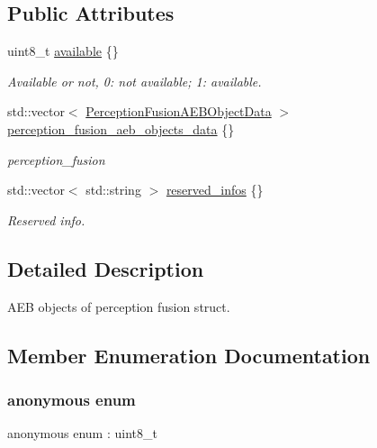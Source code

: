 \subsection*{Public Attributes}
\begin{DoxyCompactItemize}
\item 
uint8\+\_\+t \hyperlink{structmaf__perception__interface_1_1PerceptionFusionAEBObjects_a96c15fc402b3898c14ec65bafa74fe63}{available} \{\}
\begin{DoxyCompactList}\small\item\em Available or not, 0\+: not available; 1\+: available. \end{DoxyCompactList}\item 
std\+::vector$<$ \hyperlink{structmaf__perception__interface_1_1PerceptionFusionAEBObjectData}{Perception\+Fusion\+A\+E\+B\+Object\+Data} $>$ \hyperlink{structmaf__perception__interface_1_1PerceptionFusionAEBObjects_a15ea008bb090010a7ac10b88a3b1d8ce}{perception\+\_\+fusion\+\_\+aeb\+\_\+objects\+\_\+data} \{\}
\begin{DoxyCompactList}\small\item\em perception\+\_\+fusion \end{DoxyCompactList}\item 
std\+::vector$<$ std\+::string $>$ \hyperlink{structmaf__perception__interface_1_1PerceptionFusionAEBObjects_ad0d0a4497b269c4feaf6aa99e64c835e}{reserved\+\_\+infos} \{\}
\begin{DoxyCompactList}\small\item\em Reserved info. \end{DoxyCompactList}\end{DoxyCompactItemize}


\subsection{Detailed Description}
A\+EB objects of perception fusion struct. 

\subsection{Member Enumeration Documentation}
\mbox{\label{structmaf__perception__interface_1_1PerceptionFusionAEBObjects_a553cda51d497a3cc79eace363ebec69d}} 
\subsubsection{\texorpdfstring{anonymous enum}{anonymous enum}}
{\footnotesize\ttfamily anonymous enum \+: uint8\+\_\+t}

